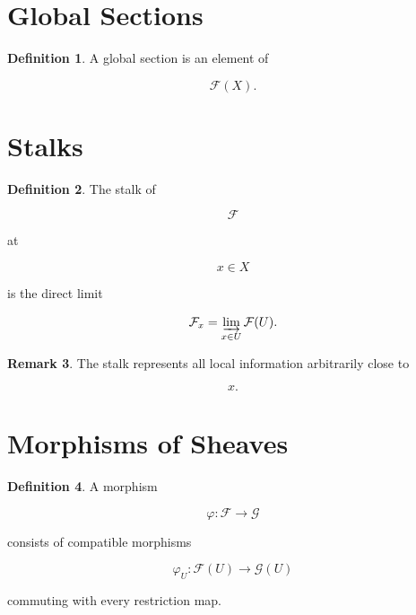 \documentclass[11pt]{book}
\numberwithin{equation}{chapter}
\theoremstyle{definition}
\newtheorem{definition}{Definition}[chapter]
\newtheorem{remark}[definition]{Remark}
\theoremstyle{plain}
\begin{document}

\section{Global Sections}

\begin{definition}

A global section is an element of

\[
\mathcal F(X).
\]

\end{definition}


\section{Stalks}

\begin{definition}

The stalk of

\[
\mathcal F
\]

at

\[
x\in X
\]

is the direct limit

\[
\mathcal F_x
=
\varinjlim_{x\in U}
\mathcal F(U).
\]

\end{definition}


\begin{remark}

The stalk represents all local information arbitrarily close to

\[
x.
\]

\end{remark}


\section{Morphisms of Sheaves}

\begin{definition}

A morphism

\[
\varphi:
\mathcal F
\rightarrow
\mathcal G
\]

consists of compatible morphisms

\[
\varphi_U:
\mathcal F(U)
\rightarrow
\mathcal G(U)
\]

commuting with every restriction map.

\end{definition}
\end{document}
